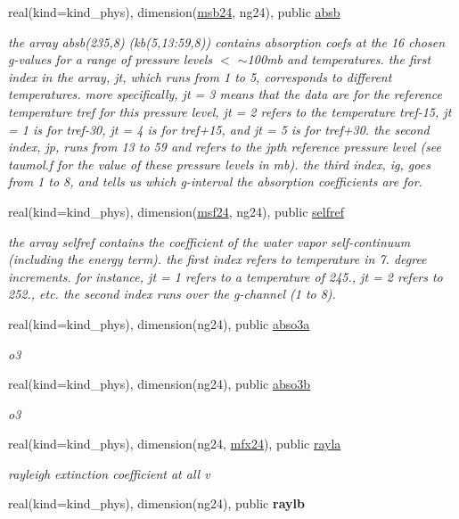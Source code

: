 \begin{Indent}
\begin{DoxyCompactItemize}
real(kind=kind\+\_\+phys), dimension(\hyperlink{group__module__radsw__kgbnn_ga0ec09b4df9fbfa868844ad93a84cbe31}{msb24}, ng24), public \hyperlink{group__module__radsw__kgbnn_gabd4db3c9678fee17f2cfd4a3e290619a}{absb}
\begin{DoxyCompactList}\small\item\em the array absb(235,8) (kb(5,13\+:59,8)) contains absorption coefs at the 16 chosen g-\/values for a range of pressure levels $<$ $\sim$100mb and temperatures. the first index in the array, jt, which runs from 1 to 5, corresponds to different temperatures. more specifically, jt = 3 means that the data are for the reference temperature tref for this pressure level, jt = 2 refers to the temperature tref-\/15, jt = 1 is for tref-\/30, jt = 4 is for tref+15, and jt = 5 is for tref+30. the second index, jp, runs from 13 to 59 and refers to the jpth reference pressure level (see taumol.\+f for the value of these pressure levels in mb). the third index, ig, goes from 1 to 8, and tells us which g-\/interval the absorption coefficients are for. \end{DoxyCompactList}\item 
real(kind=kind\+\_\+phys), dimension(\hyperlink{group__module__radsw__kgbnn_ga52d0fde0af1d5427acf0d1924f393cdc}{msf24}, ng24), public \hyperlink{group__module__radsw__kgbnn_ga784e78b5964fadd3e3e1f57f7af30802}{selfref}
\begin{DoxyCompactList}\small\item\em the array selfref contains the coefficient of the water vapor self-\/continuum (including the energy term). the first index refers to temperature in 7. degree increments. for instance, jt = 1 refers to a temperature of 245., jt = 2 refers to 252., etc. the second index runs over the g-\/channel (1 to 8). \end{DoxyCompactList}\item 
real(kind=kind\+\_\+phys), dimension(ng24), public \hyperlink{group__module__radsw__kgbnn_ga3df78e9baa46df182aad6ff9b1662dc4}{abso3a}
\begin{DoxyCompactList}\small\item\em o3 \end{DoxyCompactList}\item 
real(kind=kind\+\_\+phys), dimension(ng24), public \hyperlink{group__module__radsw__kgbnn_ga6b44aa0637523aa1f78de5b4d16c693b}{abso3b}
\begin{DoxyCompactList}\small\item\em o3 \end{DoxyCompactList}\item 
real(kind=kind\+\_\+phys), dimension(ng24, \hyperlink{group__module__radsw__kgbnn_ga6fcafb0e1605ad49a252ed1e22b00a5b}{mfx24}), public \hyperlink{group__module__radsw__kgbnn_gab24774576414b5d210c34916c3d19404}{rayla}
\begin{DoxyCompactList}\small\item\em rayleigh extinction coefficient at all v \end{DoxyCompactList}\item 
real(kind=kind\+\_\+phys), dimension(ng24), public {\bfseries raylb}
\end{DoxyCompactItemize}
\end{Indent}
